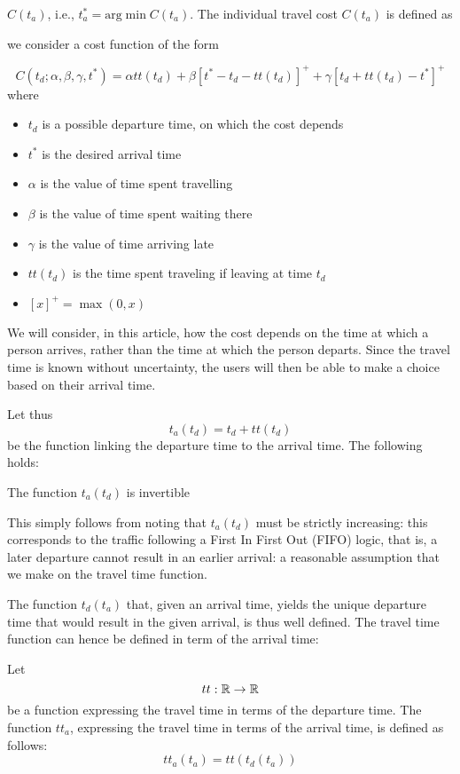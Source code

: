 $C(t_a)$, i.e.,  $t_a^* = \text{arg} \min C(t_a)$. The individual travel cost $C(t_a)$ is defined as 

we consider a cost function of the form

\begin{equation}
  \label{eq:cost-t_d}
  C(t_d; \alpha, \beta, \gamma, t^*) = \alpha tt(t_d) + \beta[t^*-t_d-tt(t_d)]^+ + \gamma[t_d+tt(t_d)-t^*]^+ 
\end{equation}
where
\begin{itemize}
\item \(t_d\) is a possible departure time, on which the cost depends
\item \(t^*\) is the desired arrival time
\item \(\alpha\) is the value of time spent travelling
\item \(\beta\) is the value of time spent waiting there
\item \(\gamma\) is the value of time arriving late
\item \(tt(t_d)\) is the time spent traveling if leaving at time \(t_d\)
\item \([x]^+ = \max(0, x)\)
\end{itemize}

We will consider, in this article,
how the cost depends on the time at which a person arrives,
rather than the time at which the person departs.
Since the travel time is known without uncertainty,
the users will then be able to make a choice based on their arrival time.

Let thus
\begin{equation}
  \label{eq:t_a-t_d}
  t_a(t_d) = t_d + tt(t_d)
\end{equation}
be the function linking the departure time to the arrival time.
The following holds:
\begin{obs}
  \label{obs:inv-t_a}
  The function \(t_a(t_d)\) is invertible
\end{obs}
This simply follows from noting that  \(t_a(t_d)\) must be strictly increasing:
this corresponds to the traffic following a First In First Out (FIFO) logic,
that is, a later departure cannot result in an earlier arrival:
a reasonable assumption that we make on the travel time function.

The function \(t_d(t_a)\) that, given an arrival time,
yields the unique departure time that would result in the given arrival,
is thus well defined.
The travel time function can hence be defined in term of the arrival time:
\begin{definition}
  \label{def:tta}
  Let
  \begin{equation*}
    tt:\mathbb{R} \rightarrow \mathbb{R}
  \end{equation*}
  be a function expressing the travel time in terms of the departure time.
  The function \(tt_a\), expressing the travel time in terms of the arrival time, is defined as follows:
  \begin{equation*}
    tt_a(t_a) = tt(t_d(t_a))
  \end{equation*}
\end{definition}

